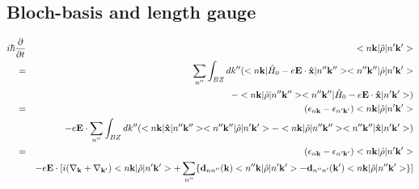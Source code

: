 \documentclass[aps,prb,preprint]{revtex4-1}
\begin{document}
\begin{appendix}

\section{Bloch-basis and length gauge}
\begin{eqnarray}\label{eq:BL} 
i \hbar \frac{ \partial }{\partial t } &&<n{\bf k}| \hat{\rho} |n'{\bf k'}> \nonumber \\
= && \sum_{n''} \int_{BZ} dk''  ( <n{\bf k}| \hat{H}_0 -e{\bf E} \cdot {\bf \hat{x}} |n''{\bf k''}><n''{\bf k''}| \hat{\rho} |n'{\bf k'}> \nonumber  \\
&&- <n{\bf k}| \hat{\rho} |n''{\bf k''}><n''{\bf k''}| \hat{H}_0 -e{\bf E} \cdot {\bf \hat{x}}  |n'{\bf k'}> )\nonumber  \\
= && (\epsilon_{n{\bf k}}-\epsilon_{n'{\bf k'}}) <n{\bf k}| \hat{\rho} |n'{\bf k'}> \nonumber  \\
&&-e{\bf E} \cdot \sum_{n''}\int_{BZ} dk'' ( <n{\bf k}| {\bf \hat{x}} |n''{\bf k''}> <n''{\bf k''}| \hat{\rho} |n'{\bf k'}> - <n{\bf k}| \hat{\rho} |n''{\bf k''}> <n''{\bf k''}| {\bf \hat{x}} |n'{\bf k'}> ) \nonumber  \\
= && (\epsilon_{n{\bf k}}-\epsilon_{n'{\bf k'}}) <n{\bf k}| \hat{\rho} |n'{\bf k'}> \nonumber  \\
&&-e{\bf E} \cdot [  i ( \nabla_{\bf k} + \nabla_{\bf k'} ) <n{\bf k}|\hat{\rho}|n'{\bf k'}> + \sum_{n''}\{ {\bf d}_{nn''}({\bf k})<n''{\bf k}|\hat{\rho}|n'{\bf k'}> - {\bf d}_{n''n'}({\bf k'})<n{\bf k}|\hat{\rho}|n''{\bf k'}> \} ] \nonumber  \\
\end{eqnarray}


\end{appendix}
\end{document}
